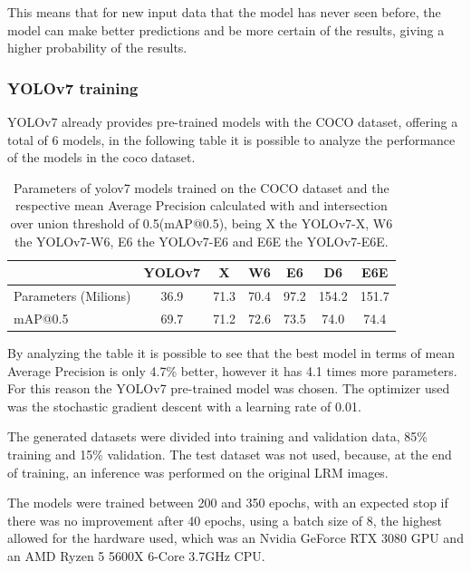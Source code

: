 This means that for new input data that the model has never seen before, the model can make better predictions and be more certain of the results, giving a higher probability of the results.



\subsubsection{YOLOv7 training}


YOLOv7 already provides pre-trained models with the COCO dataset, offering a total of 6 models, in the following table it is possible to analyze the performance of the models in the coco dataset.

\begin{table}[H]
\centering
\begin{tabular}{|p{2cm}| c |c |c |c |c |c|} 
 \hline
  &  YOLOv7 & X & W6 & E6 & D6 & E6E \\ [0.2ex] 
 \hline\hline
 Parameters (Milions) & 36.9 & 71.3 & 70.4 & 97.2 & 154.2 & 151.7\\ 
 mAP@0.5 & 69.7 & 71.2 & 72.6 & 73.5 & 74.0 & 74.4 \\[1ex] 
 \hline
\end{tabular}
\caption{Parameters of yolov7 models trained on the COCO dataset and the respective mean Average Precision calculated with and intersection over union threshold of 0.5(mAP@0.5), being X the YOLOv7-X, W6 the YOLOv7-W6, E6 the YOLOv7-E6 and E6E the YOLOv7-E6E.}
\end{table}

By analyzing the table it is possible to see that the best model in terms of mean Average Precision is only 4.7\% better, however it has 4.1 times more parameters. For this reason the YOLOv7 pre-trained model was chosen. The optimizer used was the stochastic gradient descent with a learning rate of 0.01.

The generated datasets were divided into training and validation data, 85\% training and 15\% validation. The test dataset was not used, because, at the end of training, an inference was performed on the original LRM images.

The models were trained between 200 and 350 epochs, with an expected stop if there was no improvement after 40 epochs, using a batch size of 8, the highest allowed for the hardware used, which was an Nvidia GeForce RTX 3080 GPU and an AMD Ryzen 5 5600X 6-Core 3.7GHz CPU.

